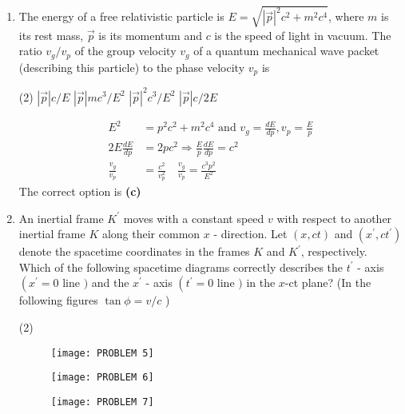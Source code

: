 \begin{enumerate}
	\item The energy of a free relativistic particle is $E=\sqrt{|\vec{p}|^{2} c^{2}+m^{2} c^{4}}$, where $m$ is its rest mass, $\vec{p}$ is its momentum and $c$ is the speed of light in vacuum. The ratio $v_{g} / v_{p}$ of the group velocity $v_{g}$ of a quantum mechanical wave packet (describing this particle) to the phase velocity $v_{p}$ is
	{}
\begin{tasks}(2)
	\task[\textbf{A.}] $|\vec{p}| c / E$
	\task[\textbf{B.}]$|\vec{p}| m c^{3} / E^{2}$
	\task[\textbf{C.}] $|\vec{p}|^{2} c^{3} / E^{2}$
	\task[\textbf{D.}]$|\vec{p}| c / 2 E$
\end{tasks}
	\begin{answer}
		\begin{align*}
		E^{2}&=p^{2} c^{2}+m^{2} c^{4} \text { and } v_{g}=\frac{d E}{d p}, v_{p}=\frac{E}{p}\\
		2 E \frac{d E}{d p}&=2 p c^{2} \Rightarrow \frac{E}{p} \frac{d E}{d p}=c^{2}\\
		\frac{v_{g}}{v_{p}}&=\frac{c^{2}}{v_{p}^{2}} \quad \frac{v_{g}}{v_{p}}=\frac{c^{3} p^{2}}{E^{2}}
		\end{align*}
		The correct option is \textbf{(c)}
\end{answer}
	\item An inertial frame $K^{\prime}$ moves with a constant speed $v$ with respect to another inertial frame $K$ along their common $x$ - direction. Let $(x, c t)$ and $\left(x^{\prime}, c t^{\prime}\right)$ denote the spacetime coordinates in the frames $K$ and $K^{\prime}$, respectively. Which of the following spacetime diagrams correctly describes the $t^{\prime}$ - axis $\left(x^{\prime}=0\right.$ line $)$ and the $x^{\prime}$ - axis $\left(t^{\prime}=0\right.$ line $)$ in the $x$-ct plane? (In the following figures $\tan \phi=v / c$ )
{	}
\begin{tasks}(2)
	\task[\textbf{A.}]\begin{figure}[H]
		\centering
		\texttt{[image: PROBLEM 5]}
	\end{figure}
	\task[\textbf{B.}]\begin{figure}[H]
		\centering
		\texttt{[image: PROBLEM 6]}
	\end{figure}
	\task[\textbf{C.}]\begin{figure}[H]
		\centering
		\texttt{[image: PROBLEM 7]}
	\end{figure}
	\task[\textbf{D.}]\begin{figure}[H]

\end{figure}
\end{tasks}
\end{enumerate}
